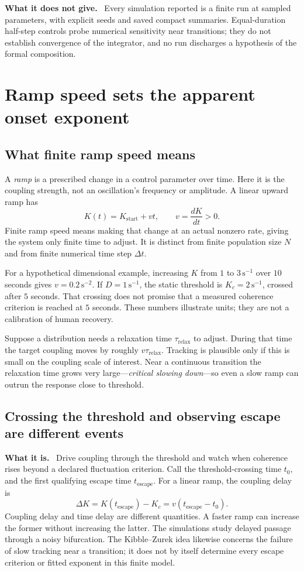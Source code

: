 \documentclass[11pt]{article}
\newcommand{\what}{\par\smallskip\noindent\textbf{What it is.}\ }
\newcommand{\scope}{\par\smallskip\noindent\textbf{What it does not give.}\ }
\begin{document}
\scope
Every simulation reported is a finite run at sampled parameters, with explicit
seeds and saved compact summaries. Equal-duration half-step controls probe
numerical sensitivity near transitions; they do not establish convergence of
the integrator, and no run discharges a hypothesis of the formal composition.

\section{Ramp speed sets the apparent onset exponent}
\label{sec:ramp}

\subsection{What finite ramp speed means}

A \emph{ramp} is a prescribed change in a control parameter over time.
Here it is the coupling strength, not an oscillation's frequency or amplitude.
A linear upward ramp has
\[
 K(t)=K_{\mathrm{start}}+vt,\qquad v=\frac{dK}{dt}>0.
\]
Finite ramp speed means making that change at an actual nonzero rate, giving
the system only finite time to adjust. It is distinct from finite population
size $N$ and from finite numerical time step $\Delta t$.

For a hypothetical dimensional example, increasing $K$ from $1$ to
$3\,\mathrm{s}^{-1}$ over $10$ seconds gives $v=0.2\,\mathrm{s}^{-2}$.
If $D=1\,\mathrm{s}^{-1}$, the static threshold is
$K_c=2\,\mathrm{s}^{-1}$, crossed after $5$ seconds. That crossing does
not promise that a measured coherence criterion is reached at $5$ seconds.
These numbers illustrate units; they are not a calibration of human recovery.

Suppose a distribution needs a relaxation time $\tau_{\mathrm{relax}}$ to
adjust. During that time the target coupling moves by roughly
$v\tau_{\mathrm{relax}}$. Tracking is plausible only if this is small on
the coupling scale of interest. Near a continuous transition the relaxation
time grows very large---\emph{critical slowing down}---so even a slow ramp
can outrun the response close to threshold.

\subsection{Crossing the threshold and observing escape are different events}

\what
Drive coupling through the threshold and watch when coherence rises beyond a
declared fluctuation criterion. Call the threshold-crossing time $t_0$, and
the first qualifying escape time $t_{\mathrm{escape}}$. For a linear ramp,
the coupling delay is
\[
 \Delta K=K(t_{\mathrm{escape}})-K_c
         =v(t_{\mathrm{escape}}-t_0).
\]
Coupling delay and time delay are different quantities. A faster ramp can
increase the former without increasing the latter. The simulations study
delayed passage through a noisy bifurcation. The Kibble--Zurek idea likewise
concerns the failure of slow tracking near a transition; it does not by itself
determine every escape criterion or fitted exponent in this finite model.
\end{document}
